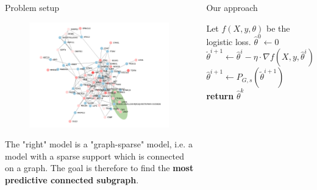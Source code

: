 \documentclass[svgnames,final]{beamer}
\newcommand{\thetahat}{\ensuremath{\hat{\theta}}}
\newcommand{\thetatilde}{\ensuremath{\tilde{\theta}}}
\newcommand{\thetahat}{\ensuremath{\hat{\theta}}}
\begin{document}
\begin{frame}
\begin{columns}[T]
\begin{column}{.3\linewidth}
\begin{block}{Problem setup}
		\begin{figure}[h]
		\centering
		\includegraphics[width=0.8\linewidth]{images/graph.pdf}
		\end{figure}

		The "right" model is a "graph-sparse" model, i.e. a model with a sparse support which is connected on a graph.
		The goal is therefore to find the \textbf{most predictive connected subgraph}.

	\end{block}

	\vspace{2cm}

\end{column}

\begin{column}{.3\linewidth}

	\begin{block}{Our approach}

		\begin{algorithmic}%
		\State Let $f(X, y, \theta)$ be the logistic loss.
		\State $\thetahat^0 \gets 0$
		\State $\thetatilde^{i+1} \gets \thetahat^i - \eta \cdot \nabla f(X, y, \thetahat^i)$
		\State $\thetahat^{i+1} \gets P_{G,s}(\thetatilde^{i+1})$ 
		\EndFor
		\State \textbf{return} $\thetahat^k$
		\EndFunction
		\end{algorithmic}


		\vspace{2cm}


\end{block}
\end{column}
\end{columns}
\end{frame}
\end{document}
